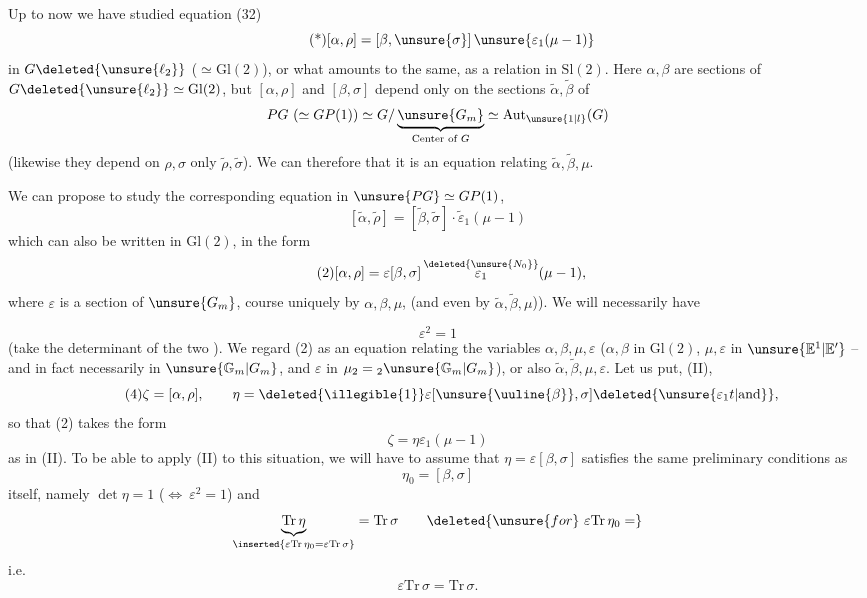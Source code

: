 Up to now we have studied equation (32)
\[
\tag{*}
[\alpha,\rho]=[\beta,\unsure{\sigma}]\,
\unsure{\varepsilon_1(\mu-1)}
\]
in $G\deleted{\unsure{\ell_2}}$ ($\simeq\mathrm{Gl}(2)$), or what amounts to the
same,  as a relation in $\mathrm{Sl}(2)$.
Here $\alpha,\beta$ are  sections of
$G\deleted{\unsure{\ell_2}}\simeq\mathrm{Gl}(2)$, but $[\alpha,\rho]$ and
$[\beta,\sigma]$ depend only on the  sections
$\widetilde\alpha,\widetilde\beta$ of
\[
PG\ (\simeq GP(1))\simeq
G/\underbrace{\unsure{G_m}}_{\text{Center of }G}
\simeq\mathrm{Aut}_{\unsure{1|l}}(G)
\]
(likewise they depend on $\rho,\sigma$ only
 $\widetilde\rho,\widetilde\sigma$).
We can therefore  that it is an equation
relating $\widetilde\alpha,\widetilde\beta,\mu$.

We can propose to study the corresponding equation in
$\unsure{PG}\simeq GP(1)$,
\[
\tag{1}
[\widetilde\alpha,\widetilde\rho]
 =[\widetilde\beta,\widetilde\sigma]\cdot\widetilde\varepsilon_1(\mu-1)
\]
which can also be written in $\mathrm{Gl}(2)$, in the  form
\[
\tag{2}
[\alpha,\rho]=\varepsilon[\beta,\sigma]\,
\overset{\deleted{\unsure{N_0}}}{\varepsilon_1}(\mu-1),
\]
where $\varepsilon$ is a section of $\unsure{G_m}$,
  course uniquely
 by $\alpha,\beta,\mu$,
(and even by $\widetilde\alpha,\widetilde\beta,\mu$)).
We will necessarily have


\[
\tag{3}
\varepsilon^2=1
\]
(take the determinant of the two ). We regard (2) as an equation
relating the variables $\alpha,\beta,\mu,\varepsilon$
($\alpha,\beta$ in $\mathrm{Gl}(2)$, $\mu,\varepsilon$ in
$\unsure{\mathbb E^1|\mathbb E'}$ -- and in fact necessarily in
$\unsure{\mathbb G_m|G_m}$, and $\varepsilon$  in
$\mu_2={}_2\unsure{\mathbb G_m|G_m}$), or also
$\widetilde\alpha,\widetilde\beta,\mu,\varepsilon$.
Let us put,  (II),
\[
\tag{4}
\zeta=[\alpha,\rho],\qquad
\eta=\deleted{\illegible{1}}\varepsilon
[\unsure{\uuline{\beta}},\sigma]\deleted{\unsure{\varepsilon_1 t|\text{and}}},
\]
so that (2) takes the form
\[
\tag{5}
\zeta=\eta\varepsilon_1(\mu-1)
\]
as in (II). To be able to apply (II) to this situation, we will have to
assume that $\eta=\varepsilon[\beta,\sigma]$ satisfies the
same preliminary conditions as
\[
\eta_0=[\beta,\sigma]
\]
itself, namely $\det\eta=1$
($\Longleftrightarrow\ \varepsilon^2=1$) and
\[
\underbrace{\mathrm{Tr}\,\eta}_{\inserted{\varepsilon\mathrm{Tr}\,\eta_0
=\varepsilon\mathrm{Tr}\,\sigma}}
=\mathrm{Tr}\,\sigma
\qquad\deleted{\unsure{for}\ \varepsilon\mathrm{Tr}\,\eta_0=}
\]
i.e.
\[
\varepsilon\mathrm{Tr}\,\sigma=\mathrm{Tr}\,\sigma.
\]

